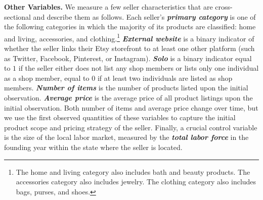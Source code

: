 \documentclass[letterpaper,12pt]{article}
\begin{document}




\textbf{Other Variables.} We measure a few seller characteristics that are cross-sectional and describe them as follows. Each seller's \textbf{\textit{primary category}} is one of the following categories in which the majority of its products are classified: home and living, accessories, and clothing.\footnote{The home and living category also includes bath and beauty products. The accessories category also includes jewelry. The clothing category also includes bags, purses, and shoes.} \textbf{\textit{External website}} is a binary indicator of whether the seller links their Etsy storefront to at least one other platform (such as Twitter, Facebook, Pinterest, or Instagram). \textbf{\textit{Solo}} is a binary indicator equal to $1$ if the seller either does not list any shop members or lists only one individual as a shop member, equal to $0$ if at least two individuals are listed as shop members. \textbf{\textit{Number of items}} is the number of products listed upon the initial observation. \textbf{\textit{Average price}} is the average price of all product listings upon the initial observation. Both number of items and average price change over time, but we use the first observed quantities of these variables to capture the initial product scope and pricing strategy of the seller. Finally, a crucial control variable is the size of the local labor market, measured by the \textbf{\textit{total labor force}} in the founding year within the state where the seller is located.
\end{document}
